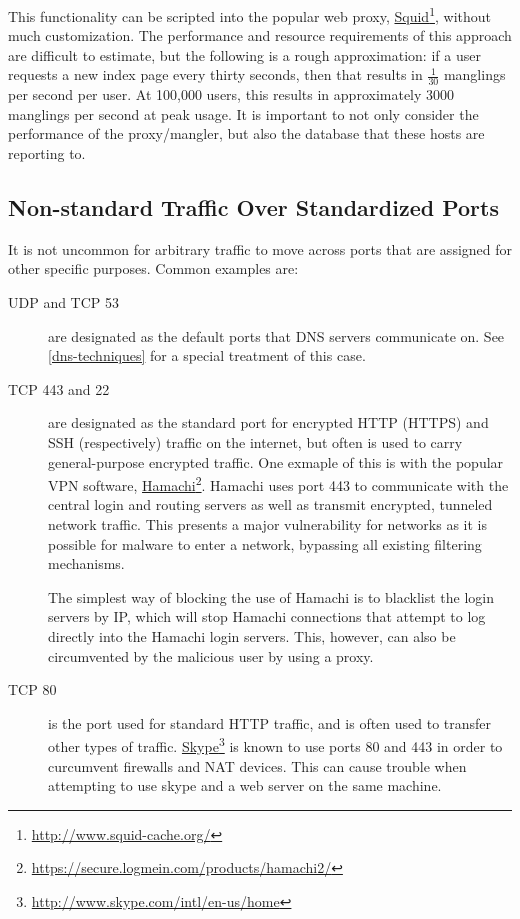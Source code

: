 \documentclass{article}
\newcommand{\hreff}[2]{\href{#1}{#2}\footnote{\url{#1}}}
\theoremstyle{remark}
\theoremstyle{definition}
\theoremstyle{definition}
\theoremstyle{definition}
\begin{document}
This functionality can be scripted into the popular web proxy, \hreff{http://www.squid-cache.org/}{Squid}, without much customization. The performance and resource requirements of this approach are difficult to estimate, but the following is a rough approximation: if a user requests a new index page every thirty seconds, then that results in $\frac{1}{30}$ manglings per second per user. At 100,000 users, this results in approximately 3000 manglings per second at peak usage. It is important to not only consider the performance of the proxy/mangler, but also the database that these hosts are reporting to.

\subsection{Non-standard Traffic Over Standardized Ports}
It is not uncommon for arbitrary traffic to move across ports that are assigned for other specific purposes. Common examples are:

\begin{description}
\item[UDP and TCP 53] are designated as the default ports that DNS servers communicate on. See \ref{dns-techniques} for a special treatment of this case.
\item[TCP 443 and 22] are designated as the standard port for encrypted HTTP (HTTPS) and SSH (respectively) traffic on the internet, but often is used to carry general-purpose encrypted traffic. One exmaple of this is with the popular VPN software, \hreff{https://secure.logmein.com/products/hamachi2/}{Hamachi}. Hamachi uses port 443 to communicate with the central login and routing servers as well as transmit encrypted, tunneled network traffic. This presents a major vulnerability for networks as it is possible for malware to enter a network, bypassing all existing filtering mechanisms.

The simplest way of blocking the use of Hamachi is to blacklist the login servers by IP, which will stop Hamachi connections that attempt to log directly into the Hamachi login servers. This, however, can also be circumvented by the malicious user by using a proxy.
\item[TCP 80] is the port used for standard HTTP traffic, and is often used to transfer other types of traffic. \hreff{http://www.skype.com/intl/en-us/home}{Skype} is known to use ports 80 and 443 in order to curcumvent firewalls and NAT devices. This can cause trouble when attempting to use skype and a web server on the same machine.
\end{description}
\end{document}
